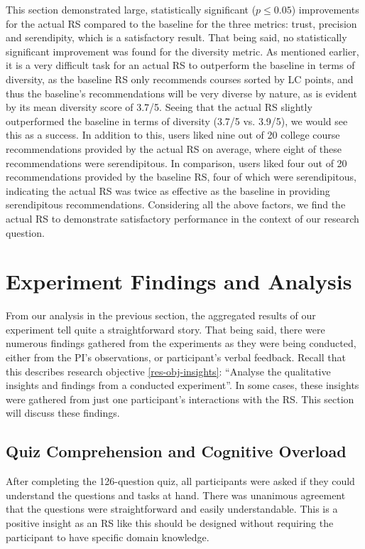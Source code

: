 This section demonstrated large, statistically significant ($p \leq 0.05$) improvements 
for the actual RS compared to the baseline for the three metrics:
trust, precision and serendipity,
which is a satisfactory result.
That being said, no statistically significant improvement was found for the diversity metric.
As mentioned earlier, it is a very difficult task for an actual RS to outperform the baseline in terms of diversity,
as the baseline RS only recommends courses 
sorted by LC points, and thus the baseline's recommendations will be very diverse by nature, as is evident by its mean diversity score of 3.7/5.
Seeing that the actual RS slightly outperformed the baseline in terms of diversity (3.7/5 vs. 3.9/5),
we would see this as a success.
In addition to this, users liked nine out of 20 college course recommendations provided by the actual RS on average,
where eight of these recommendations were serendipitous.
In comparison, users liked four out of 20 recommendations provided by the baseline RS,
four of which were serendipitous,
indicating the actual RS was twice as effective as the baseline in providing serendipitous recommendations.
Considering all the above factors, we find the actual RS to demonstrate satisfactory performance in the context of our research question.

\section{Experiment Findings and Analysis}
\label{sec:experiment-findings}

From our analysis in the previous section, the aggregated results of our experiment tell quite a straightforward story.
That being said, there were numerous findings gathered from the experiments as they were being conducted,
either from the PI's observations, or participant's verbal feedback.
Recall that this describes research objective \ref{res-obj-insights}: ``Analyse the qualitative insights and findings from a conducted experiment''.
In some cases, these insights were gathered from just one participant's interactions with the RS.
This section will discuss these findings.

\subsection{Quiz Comprehension and Cognitive Overload}

After completing the 126-question quiz, all participants were asked if they could understand the questions 
and tasks at hand. 
There was unanimous agreement that the questions were straightforward and easily understandable.
This is a positive insight as an RS like this should be designed without requiring the participant to have specific domain knowledge.

